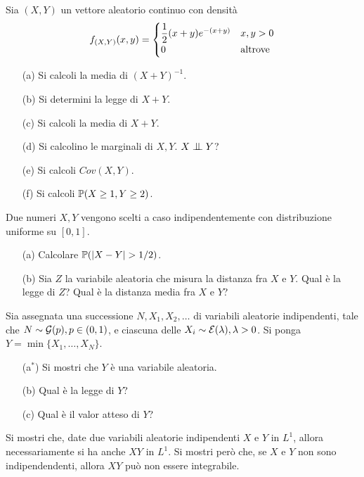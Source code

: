\Esercizio{}
Sia $(X,Y)$ un vettore aleatorio continuo con densità
\[
f_{(X,Y)}(x,y)=\begin{cases} \dfrac{1}{2}(x+y)e^{-(x+y)} &x,y>0 \\ 0&\text{altrove} \end{cases}
\]
\begin{enumerate}
\item [(a)] Si calcoli la media di $(X+Y)^{-1}$.
\item [(b)] Si determini la legge di $X+Y$.
\item [(c)] Si calcoli la media di $X+Y$.
\item [(d)] Si calcolino le marginali di $X,Y$. $X\indep Y$?
\item [(e)] Si calcoli $Cov(X,Y)$.
\item [(f)] Si calcoli $\mathbb{P}(X\geq 1,Y\geq 2)$.
\end{enumerate}

\Esercizio{} %
Due numeri $X,Y$ vengono scelti a caso indipendentemente con distribuzione uniforme su $[0,1]$.
\begin{enumerate}
\item [(a)] Calcolare $\PP(|X-Y|>1/2)$.
\item [(b)] Sia $Z$ la variabile aleatoria che misura la distanza fra $X$ e $Y$. Qual è la legge di $Z$? Qual è la distanza media fra $X$ e $Y$?
\end{enumerate}

\Esercizio{} %
Sia assegnata una successione $N,X_1,X_2,\dots$ di variabili aleatorie indipendenti, tale che $N\sim\mathcal{G}(p), p\in(0,1)$, e ciascuna delle $X_i\sim\mathcal{E}(\lambda),\lambda>0$. Si ponga $Y=\min\{X_1,\dots,X_N  \}$.
\begin{enumerate}
\item [(a$^*$)] Si mostri che $Y$ è una variabile aleatoria.
\item [(b)] Qual è la legge di $Y$?
\item [(c)] Qual è il valor atteso di $Y$? 
\end{enumerate}

\Esercizio{} %
Si mostri che, date due variabili aleatorie indipendenti $X$ e $Y$ in $L^1$, allora necessariamente si ha anche $XY$ in $L^1$. Si mostri però che, se $X$ e $Y$ non sono indipendendenti, allora $XY$ può non essere integrabile.

